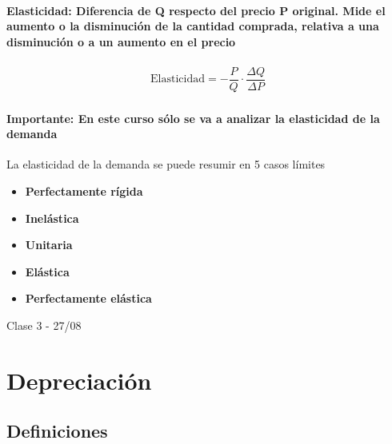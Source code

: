 \documentclass[12pt,a4paper]{article}
\newcommand{\definicion}[1]{\paragraph{\indent #1} \hspace{0pt}}
\begin{document}
    \definicion{Elasticidad: Diferencia de Q respecto del precio P original. Mide el aumento o la disminución de la cantidad comprada, relativa a una disminución o a un aumento en el precio}
    \begin{align}
    	\text{Elasticidad} = -\dfrac{P}{Q} \cdot \dfrac{\Delta Q}{\Delta P}
	\end{align}
    
    \definicion{Importante: En este curso sólo se va a analizar la elasticidad de la demanda}
    
    \newpage
    
    \par{
    	La elasticidad de la demanda se puede resumir en 5 casos límites
        }
    
    \begin{itemize}
		\item	\textbf{Perfectamente rígida}
        
        \item	\textbf{Inelástica}
        
        \item	\textbf{Unitaria}
        
        \item	\textbf{Elástica}
        
        \item	\textbf{Perfectamente elástica}
        
	\end{itemize}
    
    \newpage


Clase 3 - 27/08 \hrulefill

\section{Depreciación}

	\subsection{Definiciones}
    
    
\end{document}
